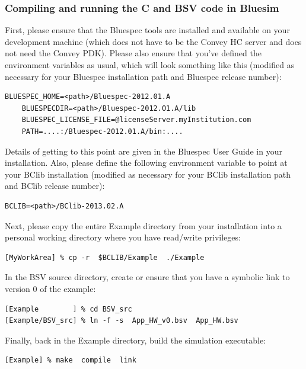 \documentclass[twoside,letterpaper,11pt]{article}
\begin{document}
\subsubsection{Compiling and running the C and BSV code in Bluesim}

\label{sec_running_on_Bluesim}

First, please ensure that the Bluespec tools are installed and
available on your development machine (which does not have to be the
Convey HC server and does not need the Convey PDK).  Please also
ensure that you've defined the environment variables as usual, which
will look something like this (modified as necessary for your Bluespec
installation path and Bluespec release number):

\begin{Verbatim}[frame=single, label=Bluespec installation] 
    BLUESPEC_HOME=<path>/Bluespec-2012.01.A
    BLUESPECDIR=<path>/Bluespec-2012.O1.A/lib
    BLUESPEC_LICENSE_FILE=@licenseServer.myInstitution.com
    PATH=....:/Bluespec-2012.01.A/bin:....
\end{Verbatim}

Details of getting to this point are given in the Bluespec User Guide
in your installation.  Also, please define the following environment
variable to point at your BClib installation (modified as necessary
for your BClib installation path and BClib release number):

\begin{Verbatim}[frame=single, label=Bluespec installation] 
    BCLIB=<path>/BClib-2013.02.A
\end{Verbatim}

Next, please copy the entire Example directory from your installation
into a personal working directory where you have read/write
privileges:

\begin{Verbatim}[frame=single, label=Make private copy of Example directory]
[MyWorkArea] % cp -r  $BCLIB/Example  ./Example
\end{Verbatim}

In the BSV source directory, create or ensure that you have a symbolic
link to version 0 of the example:

\begin{Verbatim}[frame=single, label=Properly named App\_HW.bsv application source file] 
[Example        ] % cd BSV_src
[Example/BSV_src] % ln -f -s  App_HW_v0.bsv  App_HW.bsv
\end{Verbatim}

Finally, back in the Example directory, build the simulation executable:
\begin{Verbatim}[frame=single, label=Build Bluesim executable] 
[Example] % make  compile  link
\end{Verbatim}
\end{document}
